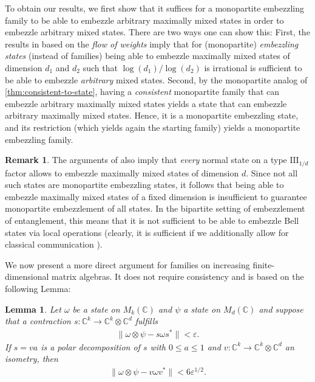 \documentclass[a4paper, 10pt, onecolumn, accepted=2025-07-22]{quantumarticle}
\newtheorem{lemma}[theorem]{Lemma}
\theoremstyle{definition}
\newtheorem{remark}[theorem]{Remark}
\newcommand{\norm}[1]{\lVert #1\rVert}
\newcommand{\ox}{\otimes}
\newcommand{\eps}{\varepsilon}
\newcommand{\III}{{\mathrm{III}}}
\def\CC{{\mathbb C}}
\newcommand*{\1}{\text{\usefont{U}{bbold}{m}{n}1}}
\begin{document}
To obtain our results, we first show that it suffices for a monopartite embezzling family to be able to embezzle arbitrary maximally mixed states in order to embezzle arbitrary mixed states. 
There are two ways one can show this:
First, the results in \cite{long_paper} based on the \emph{flow of weights} imply that  for (monopartite) \emph{embezzling states} (instead of families) being able to embezzle maximally mixed states of dimension $d_1$ and $d_2$ such that $\log(d_1)/\log(d_2)$ is irrational is sufficient to be able to embezzle \emph{arbitrary} mixed states. 
Second, by the monopartite analog of \cref{thm:consistent-to-state}, having a \emph{consistent} monopartite family that can embezzle arbitrary maximally mixed states yields a state that can embezzle arbitrary maximally mixed states. Hence, it is a monopartite embezzling state, and its restriction (which yields again the starting family) yields a monopartite embezzling family.


\begin{remark}\label{rem:traces}
    The arguments of \cite{long_paper} also imply that \emph{every} normal state on a type $\III_{1/d}$ factor allows to embezzle maximally mixed states of dimension $d$. Since not all such states are monopartite embezzling states, it follows that being able to embezzle maximally mixed states of a fixed dimension is insufficient to guarantee monopartite embezzlement of all states. In the bipartite setting of embezzlement of entanglement, this means that it is not sufficient to be able to embezzle Bell states via local operations (clearly, it is sufficient if we additionally allow for classical communication \cite{nielsen_conditions_1999}).
\end{remark}

We now present a more direct argument for families on increasing finite-dimensional matrix algebras. It does not require consistency and is based on the following Lemma:

\begin{lemma}\label{lem:contractions}
    Let $\omega$ be a state on $M_k(\CC)$ and $\psi$ a state on $M_d(\CC)$ and suppose that a contraction $s:\CC^k\to \CC^k\ox \CC^d$ fulfills
    \begin{align}
        \norm{\omega\ox \psi - s \omega s^*}<\eps.
    \end{align}
    If $s=va$ is a polar decomposition of $s$ with $0\leq a\leq 1$ and $v:\CC^k\to \CC^k\ox \CC^d$ an isometry, then
      \begin{align}
        \norm{\omega\ox \psi - v\omega v^*}<6\eps^{1/2}.
    \end{align}
\end{lemma}
\end{document}
